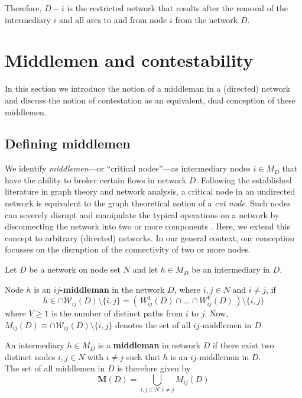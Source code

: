 \noindent
Therefore, $D-i$ is the restricted network that results after the removal of the intermediary $i$ and all arcs to and from node $i$ from the network $D$.

\section{Middlemen and contestability}
\label{sec:MiddlemanContestability}

In this section we introduce the notion of a middleman in a (directed) network and discuss the notion of contestation as an equivalent, dual conception of these middlemen.

\subsection{Defining middlemen}

We identify \textit{middlemen}---or ``critical nodes''---as intermediary nodes $i \in M_D$ that have the ability to broker certain flows in network $D$. Following the established literature in graph theory and network analysis, a critical node in an undirected network is equivalent to the graph theoretical notion of a \emph{cut node}. Such nodes can severely disrupt and manipulate the typical operations on a network by disconnecting the network into two or more components \citep{KalaiMiddlemen1978,Burt1992,JacksonWolinsky1996,GillesChakrabarti2006}. Here, we extend this concept to arbitrary (directed) networks. In our general context, our conception focusses on the disruption of the connectivity of two or more nodes.

\begin{definition} \label{middleman}
Let $D$ be a network on node set $N$ and let $h \in M_D$ be an intermediary in $D$.
\begin{abet}
\item Node $h$ is an \textbf{$ij$-middleman} in the network $D$, where $i,j \in N$ and $i \neq j$, if
\begin{equation} \label{ijmiddleman}
h \in \cap \mathcal{W}_{ij}(D) \setminus \{ i,j \} = \left( \, W_{ij}^{1}(D) \cap  \ldots  \cap W_{ij}^{V}(D) \, \right) \setminus \{ i,j \}
\end{equation}
where $V \geqslant 1$ is the number of distinct paths from $i$ to $j$. Now, $M_{ij}(D) \equiv \cap \mathcal{W}_{ij}(D) \setminus \{ i,j \}$ denotes the set of all $ij$-middlemen in $D$.

\item An intermediary $h \in M_D$ is a \textbf{middleman} in network $D$ if there exist two distinct nodes $i,j \in N$ with $i \neq j$ such that $h$ is an $ij$-middleman in $D$. \\ The set of all middlemen in $D$ is therefore given by
\begin{equation} \label{middlemanseteq}
\mathbf{M} (D) = \bigcup_{i,j \in N \colon i \neq j} M_{ij}(D)
\end{equation}
\end{abet}
\end{definition}

